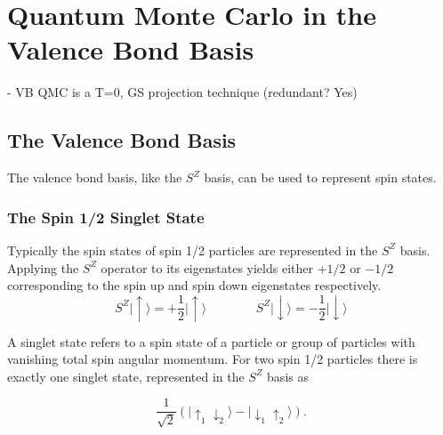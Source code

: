 \chapter{Quantum Monte Carlo in the Valence Bond Basis}

{\color{red} - VB QMC is a T=0, GS projection technique (redundant? Yes)}
\\
\section{The Valence Bond Basis}

{\color{red} The valence bond basis, like the $S^Z$ basis, can be used to represent spin states.}

\subsection{The Spin 1/2 Singlet State}


Typically the spin states of spin 1/2 particles are represented in the $S^Z$ basis.  Applying the
$S^Z$ operator to its eigenstates yields either $+1/2$ or $-1/2$ corresponding to the spin up
and spin down eigenstates respectively.
\begin{equation}
   S^Z\lvert \uparrow \rangle = +\frac{1}{2} \lvert \uparrow \rangle
   \:\:\:    \:\:\:    \:\:\:    \:\:\:    \:\:\:    \:\:\: 
   S^Z\lvert \downarrow \rangle = -\frac{1}{2} \lvert \downarrow \rangle
   \label{SZ}
\end{equation}

A singlet state refers to a spin state of a particle or group of particles with vanishing total spin angular momentum.
For two spin 1/2 particles there is exactly one singlet state, represented in the $S^Z$ basis as

\begin{equation}
  \frac{1}{\sqrt{2}}\left( \lvert \uparrow_1 \downarrow_2 \rangle - \lvert \downarrow_1 \uparrow_2 \rangle \right) .
   \label{singlet}
\end{equation}

